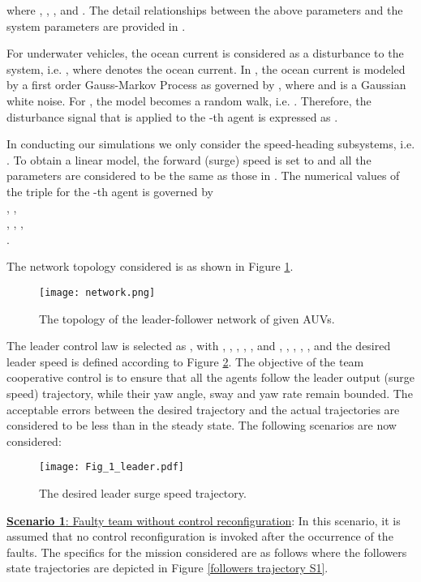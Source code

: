 \documentclass[12pt,draftcls,onecolumn]{IEEEtran}
\begin{document}
where , , , and . The detail relationships between the above parameters and the system parameters are  provided in \cite{jakuba2003}.
\par
For underwater vehicles, the ocean current is considered as a disturbance to the system, i.e. , where  denotes the ocean current. In \cite{fossen2002}, the ocean current   is  modeled  by a first order Gauss-Markov Process as governed by , where  and  is a Gaussian white noise. For , the model becomes a random walk, i.e. . Therefore, the disturbance signal that  is applied to the -th agent is expressed as . \par
 In conducting our simulations 
we only consider the  speed-heading subsystems, i.e. .  
To obtain a linear model, the  forward (surge) speed   is set to  and  all the parameters are considered to be the same as those in 
\cite{jakuba2003,elec2:2015:MISC}. 
The  numerical values of the triple   for the -th agent is governed  by \\ 
,
            ,\\   
,  , ,\\ .
 \par
  The network topology  considered is as shown in Figure \ref{network}.  
        \begin{figure}[thpb]
      \centering
        \texttt{[image: network.png]}
      \caption{The topology of the leader-follower network of given AUVs.}     
      \label{network}
   \end{figure}  
   The leader control law is selected as , with  ,  
    ,  
   , 
   , 
   , and , 
    , 
   , 
    , 
    , and the desired leader  speed  is  defined according to Figure \ref{leader trajectory}. The objective of the team cooperative control is to ensure that all the agents follow the leader output (surge speed) trajectory, while their yaw angle,  sway and yaw rate remain bounded. The acceptable errors  between the desired trajectory and the actual trajectories are considered to be less than  in the steady state. The following scenarios are now considered:\\
      \begin{figure}[thpb]
      \centering
        \texttt{[image: Fig\_1\_leader.pdf]}
      \caption{The desired leader surge speed trajectory.}     
      \label{leader trajectory}
   \end{figure}  
 \underline{  \textbf{Scenario 1}: Faulty team without control reconfiguration}: In this scenario, it is assumed that no control reconfiguration is invoked after the occurrence of the faults. The specifics for the mission considered are  as follows where the followers state trajectories are depicted in Figure \ref{followers trajectory S1}.\\
\end{document}
